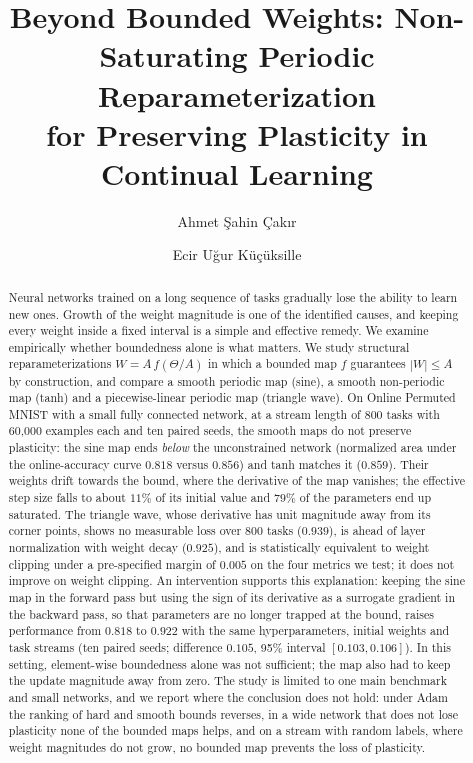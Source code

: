 \documentclass[11pt,a4paper]{article}
\title{Beyond Bounded Weights: Non-Saturating Periodic Reparameterization\\for Preserving Plasticity in Continual Learning}
\author{Ahmet \c{S}ahin \c{C}ak{\i}r \and Ecir U\u{g}ur K\"u\c{c}\"uksille\\[2pt]
\small \todo{affiliation and e-mail addresses}}
\date{}
\begin{document}
\maketitle

\begin{abstract}
Neural networks trained on a long sequence of tasks gradually lose the ability to learn new ones.
Growth of the weight magnitude is one of the identified causes, and keeping every weight inside a fixed
interval is a simple and effective remedy.
We examine empirically whether boundedness alone is what matters.
We study structural reparameterizations $W = A\,f(\Theta/A)$ in which a bounded map $f$ guarantees $|W|\le A$
by construction, and compare a smooth periodic map (sine), a smooth non-periodic map (tanh) and a
piecewise-linear periodic map (triangle wave).
On Online Permuted MNIST with a small fully connected network, at a stream length of 800 tasks with 60{,}000
examples each and ten paired seeds, the smooth maps do not preserve plasticity: the sine map ends \emph{below} the unconstrained network
(normalized area under the online-accuracy curve $0.818$ versus $0.856$) and tanh matches it ($0.859$).
Their weights drift towards the bound, where the derivative of the map vanishes; the effective step size falls
to about $11\%$ of its initial value and $79\%$ of the parameters end up saturated.
The triangle wave, whose derivative has unit magnitude away from its corner points, shows no measurable loss over 800 tasks
($0.939$), is ahead of layer normalization with weight decay ($0.925$), and is statistically equivalent to
weight clipping under a pre-specified margin of $0.005$ on the four metrics we test; it does not improve on
weight clipping.
An intervention supports this explanation: keeping the sine map in the forward pass but using the sign of
its derivative as a surrogate gradient in the backward pass, so that parameters are no longer trapped at the
bound, raises performance from $0.818$ to $0.922$ with the same hyperparameters, initial weights and task
streams (ten paired seeds; difference $0.105$, 95\% interval $[0.103,0.106]$).
In this setting, element-wise boundedness alone was not sufficient; the map also had to keep the update
magnitude away from zero. The study is limited to one main benchmark and small networks, and we report
where the conclusion does not hold: under Adam the ranking of hard and smooth bounds reverses, in a wide
network that does not lose plasticity none of the bounded maps helps, and on a stream with random labels, where
weight magnitudes do not grow, no bounded map prevents the loss of plasticity.
\end{abstract}
\end{document}
